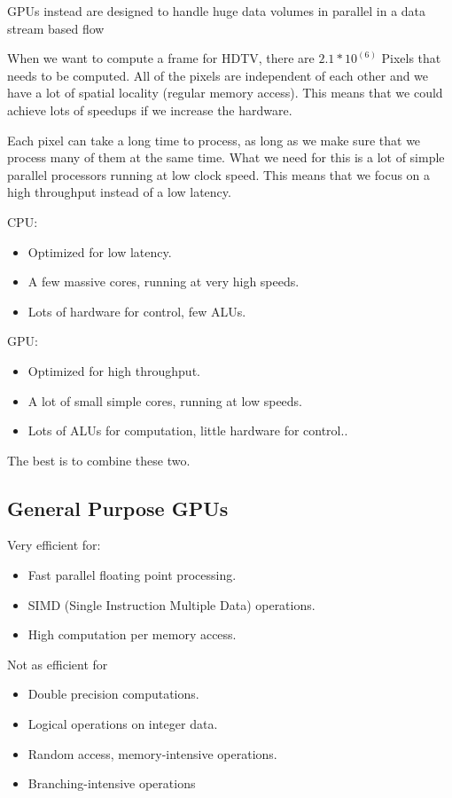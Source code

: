 GPUs instead are designed to handle huge data volumes in parallel in a data stream based flow

When we want to compute a frame for HDTV, there are $2.1*10^(6)$ Pixels that needs to be computed. All of the pixels are independent of each other and we have a lot of spatial locality (regular memory access). This means that we could achieve lots of speedups if we increase the hardware.

Each pixel can take a long time to process, as long as we make sure that we process many of them at the same time. What we need for this is a lot of simple parallel processors running at low clock speed. This means that we focus on a high throughput instead of a low latency.

CPU:
\begin{itemize}
\item Optimized for low latency.
\item A few massive cores, running at very high speeds.
\item Lots of hardware for control, few ALUs.
\end{itemize}

GPU:
\begin{itemize}
\item Optimized for high throughput.
\item A lot of small simple cores, running at low speeds.
\item Lots of ALUs for computation, little hardware for control..
\end{itemize}

The best is to combine these two.
\subsection{General Purpose GPUs}
Very efficient for:
\begin{itemize}
\item Fast parallel floating point processing.
\item SIMD (Single Instruction Multiple Data) operations.
\item High computation per memory access.
\end{itemize}

Not as efficient for
\begin{itemize}
\item Double precision computations.
\item Logical operations on integer data.
\item Random access, memory-intensive operations.
\item Branching-intensive operations
\end{itemize}

